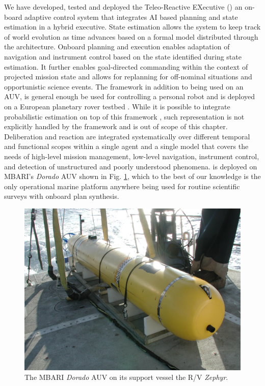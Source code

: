 We have developed, tested and deployed the Teleo-Reactive EXecutive
(\rxe) an on-board adaptive control system that integrates AI based
planning and state estimation in a hybrid
executive\cite{mcgann08a,mcgann08b,py10}.  State estimation allows the
system to keep track of world evolution as time advances based on a
formal model distributed through the architecture.  Onboard planning
and execution enables adaptation of navigation and instrument control
based on the state identified during state estimation.  It further
enables goal-directed commanding within the context of projected
mission state and allows for replanning for off-nominal situations and
opportunistic science events. The framework in addition to being used
on an AUV, is general enough  be used for controlling a
personal robot \cite{pr2,Meeussen:2010dn,mcgann2009} and is deployed
on a European planetary rover testbed \cite{goac11}. While it is
possible to integrate probabilistic estimation on top of this
framework \cite{mcgann08d}, such representation is not explicitly
handled by the framework and is out of scope of this chapter.
Deliberation and reaction are integrated systematically over different
temporal and functional scopes within a single agent and a single
model that covers the needs of high-level mission management,
low-level navigation, instrument control, and detection of
unstructured and poorly understood phenomena. \rx is deployed on
MBARI's \emph{Dorado} AUV shown in Fig. \ref{fig:auv-fig}, which to
the best of our knowledge is the only operational marine platform
anywhere being used for routine scientific surveys with onboard plan
synthesis.

\begin{figure}[t]
  \centering \vskip-5pt
  \includegraphics[scale=0.1]{figs/MBARI-AUV.jpg}
  \caption{\small The MBARI \emph{Dorado} AUV on its support vessel
    the R/V \emph{Zephyr}.}
  \label{fig:auv-fig}
  \vskip-0.3cm
\end{figure}


